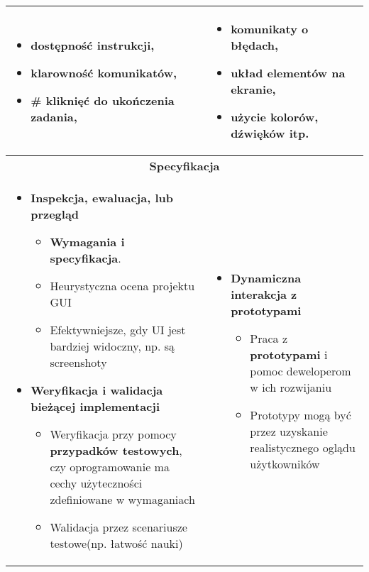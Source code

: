 \documentclass[../main.tex]{subfiles}
\begin{document}
\begin{table}[H]
\begin{center}
\begin{tabular}{| p{8cm} | p{8cm} |}
                \hline
                \begin{itemize}
                    \item dostępność instrukcji,
                    \item klarowność komunikatów,
                    \item \# kliknięć do ukończenia zadania,
                \end{itemize}
                &
                \begin{itemize}
                    \item komunikaty o błędach,
                    \item układ elementów na ekranie,
                    \item użycie kolorów, dźwięków itp.
                \end{itemize} \\
                \hline
                \hline
                \multicolumn{2}{|c|}{\textbf{Specyfikacja}} \\
                \hline
                \begin{itemize}
                    \item \textbf{Inspekcja, ewaluacja, lub przegląd}
                    \begin{itemize}
                        \item \textbf{Wymagania i specyfikacja}.
                        \item Heurystyczna ocena projektu GUI
                        \item Efektywniejsze, gdy UI jest bardziej widoczny, np. są screenshoty
                    \end{itemize}

                    \item \textbf{Weryfikacja i walidacja bieżącej implementacji}
                    \begin{itemize}
                        \item Weryfikacja przy pomocy \textbf{przypadków testowych}, czy oprogramowanie ma cechy użyteczności
                        zdefiniowane w wymaganiach
                        \item Walidacja przez scenariusze testowe(np. łatwość nauki)
                    \end{itemize}
                \end{itemize}
                &
                \begin{itemize}
                    \item \textbf{Dynamiczna interakcja z prototypami}
                    \begin{itemize}
                        \item Praca z \textbf{prototypami} i pomoc deweloperom w ich rozwijaniu
                        \item Prototypy mogą być przez uzyskanie realistycznego oglądu użytkowników
                    \end{itemize}


\end{itemize}
\end{tabular}
\end{center}
\end{table}
\end{document}
